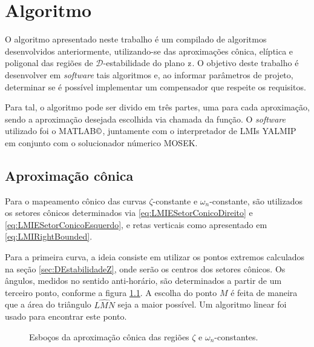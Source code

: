 \chapter{Algoritmo}

O algoritmo apresentado neste trabalho é um compilado de algoritmos desenvolvidos anteriormente, utilizando-se das aproximações cônica, elíptica e poligonal das regiões de $\mathscr{D}$-estabilidade do plano $\operatorname{\mathrm{z}}$. O objetivo deste trabalho é desenvolver em \emph{software} tais algoritmos e, ao informar parâmetros de projeto, determinar se é possível implementar um compensador que respeite os requisitos.

Para tal, o algoritmo pode ser divido em três partes, uma para cada aproximação, sendo a aproximação desejada escolhida via chamada da função. O \emph{software} utilizado foi o MATLAB$\copyright$\cite{MATLAB}, juntamente com o interpretador de LMIs YALMIP\cite{LOFBERG2004} em conjunto com o solucionador númerico MOSEK\cite{MOSEK}. 

\section{Aproximação cônica}
Para o mapeamento cônico das curvas $\zeta$-constante e $\omega_n$-constante, são utilizados os setores cônicos determinados via \eqref{eq:LMIESetorConicoDireito} e \eqref{eq:LMIESetorConicoEsquerdo}, e retas verticais como apresentado em \ref{eq:LMIRightBounded}.

Para a primeira curva, a ideia consiste em utilizar os pontos extremos calculados na seção \ref{sec:DEstabilidadeZ}, onde serão os centros dos setores cônicos. Os ângulos, medidos no sentido anti-horário, são determinados a partir de um terceiro ponto, conforme a figura \ref{subfig:AproximacaoConicaZeta}. A escolha do ponto $M$ é feita de maneira que a área do triângulo $\widehat{LMN}$ seja a maior possível. Um algoritmo linear foi usado para encontrar este ponto.

\begin{figure}[!hb]
  \centering
  \begin{subfigure}[t]{0.4\columnwidth}
      
      \caption{}
      \label{subfig:AproximacaoConicaZeta}
  \end{subfigure}
  \begin{subfigure}[t]{0.4\columnwidth}
      
      \caption{}
      \label{subfig:AproximacaoConicaWn}
  \end{subfigure}
  \caption{Esboços da aproximação cônica das regiões $\zeta$ e $\omega_n$-constantes.}
  \label{fig:AproximacoesConica}
\end{figure}

